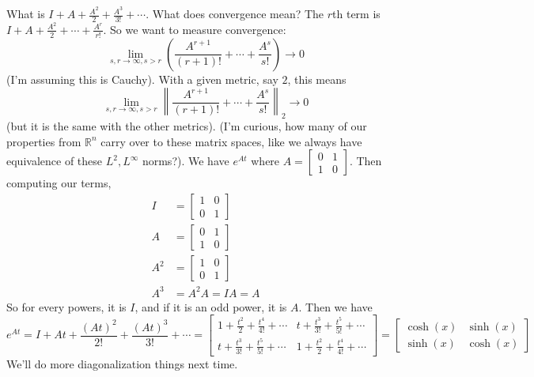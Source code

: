 \documentclass{article}
\theoremstyle{plain}
\theoremstyle{remark}
\newcommand{\R}{{\mathbb R}}
\begin{document}
What is $I +A +\frac{A^2}{2} + \frac{A^3}{3!} + \cdots$.
What does convergence mean?
The $r$th term is $I + A + \frac{A^2}{2} + \cdots + \frac{A^r}{r!}$.
So we want to measure convergence:
\[
	\lim_{s,r\to\infty, s>r} \left(\frac{A^{r+1}}{(r+1)!} + \cdots + \frac{A^s}{s!}\right)
	\to 0
\]
(I'm assuming this is Cauchy).
With a given metric, say $2$, this means
\[
	\lim_{s,r\to\infty, s>r} \left\lVert\frac{A^{r+1}}{(r+1)!} +
	\cdots + \frac{A^s}{s!}\right\rVert_2
	\to 0
\]
(but it is the same with the other metrics).
(I'm curious, how many of our properties from $\R^n$
carry over to these matrix spaces,
like we always have equivalence of these $L^2,L^\infty$ norms?).
We have $e^{At}$ where $A = \begin{bmatrix} 0 & 1 \\ 1 & 0 \end{bmatrix}$.
Then computing our terms,
\begin{align*}
	I &= \begin{bmatrix} 1 & 0 \\ 0 & 1 \end{bmatrix}\\
	A &= \begin{bmatrix} 0 & 1 \\ 1 & 0 \end{bmatrix}\\
	A^2 &= \begin{bmatrix} 1 & 0 \\ 0 & 1 \end{bmatrix}\\
	A^3 &= A^2A = IA = A
\end{align*}
So for every powers, it is $I$, and if it is an odd power, it is $A$.
Then we have
\[
	e^{At} = I +At + \frac{(At)^2}{2!} + \frac{(At)^3}{3!} + \cdots
	= \begin{bmatrix} 1 + \frac{t^2}{2} + \frac{t^4}{4!} + \cdots
		& t + \frac{t^3}{3!} + \frac{t^5}{5!} + \cdots\\
		t + \frac{t^3}{3!} + \frac{t^5}{5!} + \cdots
		& 1 + \frac{t^2}{2} + \frac{t^4}{4!} + \cdots\end{bmatrix}
	= \begin{bmatrix} \cosh(x) & \sinh(x) \\ \sinh(x) & \cosh(x) \end{bmatrix}
\]
We'll do more diagonalization things next time.
\end{document}
